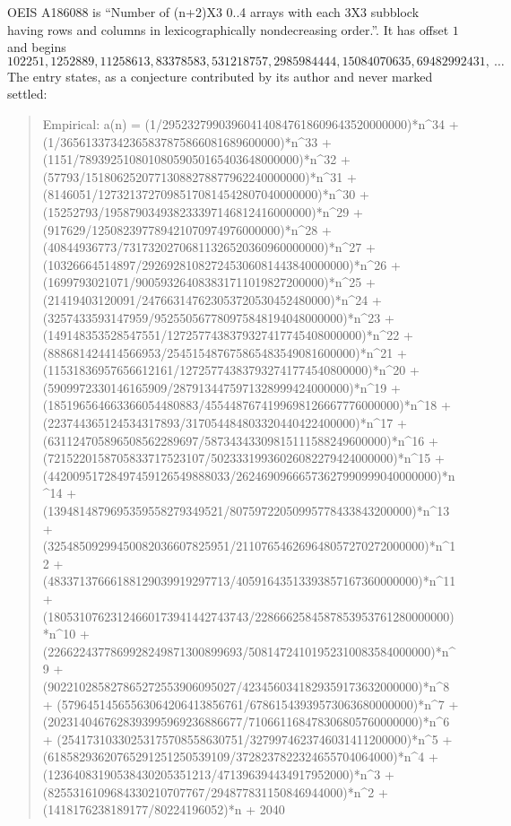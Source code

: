 \documentclass[11pt,a4paper]{article}
\theoremstyle{plain}
\theoremstyle{definition}
\begin{document}
OEIS A186088 is ``Number of (n+2)X3 0..4 arrays with each 3X3 subblock having rows and columns in lexicographically nondecreasing order.''. It has offset $1$ and begins
\[
102251, 1252889, 11258613, 83378583, 531218757, 2985984444, 15084070635, 69482992431,\ \dots
\]
The entry states, as a conjecture contributed by its author and never marked settled:
\begin{quote}\raggedright\small
Empirical: a(n) = (1/295232799039604140847618609643520000000)*n\^{}34 + (1/36561337342365837875866081689600000)*n\^{}33 + (1151/78939251080108059050165403648000000)*n\^{}32 + (57793/15180625207713088278877962240000000)*n\^{}31 + (8146051/12732137270985170814542807040000000)*n\^{}30 + (15252793/195879034938233397146812416000000)*n\^{}29 + (917629/125082397789421070974976000000)*n\^{}28 + (40844936773/73173202706811326520360960000000)*n\^{}27 + (10326664514897/292692810827245306081443840000000)*n\^{}26 + (1699793021071/900593264083831711019827200000)*n\^{}25 + (21419403120091/247663147623053720530452480000)*n\^{}24 + (3257433593147959/952550567780975848194048000000)*n\^{}23 + (149148353528547551/1272577438379327417745408000000)*n\^{}22 + (888681424414566953/254515487675865483549081600000)*n\^{}21 + (11531836957656612161/127257743837932741774540800000)*n\^{}20 + (5909972330146165909/2879134475971328999424000000)*n\^{}19 + (185196564663366054480883/4554487674199698126667776000000)*n\^{}18 + (223744365124534317893/317054484803320440422400000)*n\^{}17 + (631124705896508562289697/58734343309815111588249600000)*n\^{}16 + (7215220158705833717523107/50233319936026082279424000000)*n\^{}15 + (44200951728497459126549888033/26246909666573627990999040000000)*n\^{}14 + (1394814879695359558279349521/80759722050995778433843200000)*n\^{}13 + (32548509299450082036607825951/211076546269648057270272000000)*n\^{}12 + (48337137666188129039919297713/40591643513393857167360000000)*n\^{}11 + (18053107623124660173941442743743/2286662584587853953761280000000)*n\^{}10 + (2266224377869928249871300899693/50814724101952310083584000000)*n\^{}9 + (902210285827865272553906095027/4234560341829359173632000000)*n\^{}8 + (57964514565563064206413856761/67861543939573063680000000)*n\^{}7 + (2023140467628393995969236886677/710661168478306805760000000)*n\^{}6 + (25417310330253175708558630751/3279974623746031411200000)*n\^{}5 + (61858293620765291251250539109/3728237822324655704064000)*n\^{}4 + (12364083190538430205351213/471396394434917952000)*n\^{}3 + (8255316109684330210707767/294877831150846944000)*n\^{}2 + (1418176238189177/80224196052)*n + 2040
\end{quote}
\end{document}
